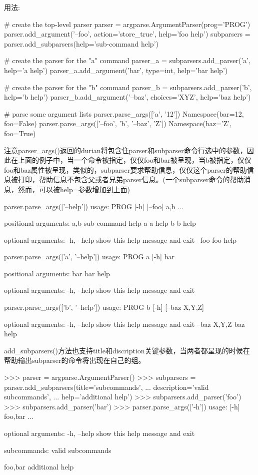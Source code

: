 用法:
\begin{python}
# create the top-level parser
parser = argparse.ArgumentParser(prog='PROG')
parser.add_argument('--foo', action='store_true', help='foo help')
subparsers = parser.add_subparsers(help='sub-command help')

# create the parser for the "a" command
parser_a = subparsers.add_parser('a', help='a help')
parser_a.add_argument('bar', type=int, help='bar help')

# create the parser for the "b" command
parser_b = subparsers.add_parser('b', help='b help')
parser_b.add_argument('--baz', choices='XYZ', help='baz help')

# parse some argument lists
parser.parse_args(['a', '12'])
Namespace(bar=12, foo=False)
parser.parse_args(['--foo', 'b', '--baz', 'Z'])
Namespace(baz='Z', foo=True)
\end{python}
注意parser\_args()返回的durian将包含住parser和subparser命令行选中的参数，因此在上面的例子中，当一个命令被指定，仅仅foo和bar被呈现，当b被指定，仅仅foo和baz属性被呈现，类似的，subparser要求帮助信息，仅仅这个parser的帮助信息被打印，帮助信息不包含父或者兄弟parser信息。(一个subparser命令的帮助消息，然而，可以被help=参数增加到上面)
\begin{python}
parser.parse_args(['--help'])
usage: PROG [-h] [--foo] {a,b} ...

positional arguments:
  {a,b}   sub-command help
    a     a help
    b     b help

optional arguments:
  -h, --help  show this help message and exit
  --foo   foo help

parser.parse_args(['a', '--help'])
usage: PROG a [-h] bar

positional arguments:
  bar     bar help

optional arguments:
  -h, --help  show this help message and exit

parser.parse_args(['b', '--help'])
usage: PROG b [-h] [--baz {X,Y,Z}]

optional arguments:
  -h, --help     show this help message and exit
  --baz {X,Y,Z}  baz help 
\end{python}
add\_subparsers()方法也支持title和discription关键参数，当两者都呈现的时候在帮助输出subparser的命令将出现在自己的组。
\begin{python}
>>> parser = argparse.ArgumentParser()
>>> subparsers = parser.add_subparsers(title='subcommands',
...                                    description='valid subcommands',
...                                    help='additional help')
>>> subparsers.add_parser('foo')
>>> subparsers.add_parser('bar')
>>> parser.parse_args(['-h'])
usage:  [-h] {foo,bar} ...

optional arguments:
  -h, --help  show this help message and exit

subcommands:
  valid subcommands

  {foo,bar}   additional help
\end{python}
